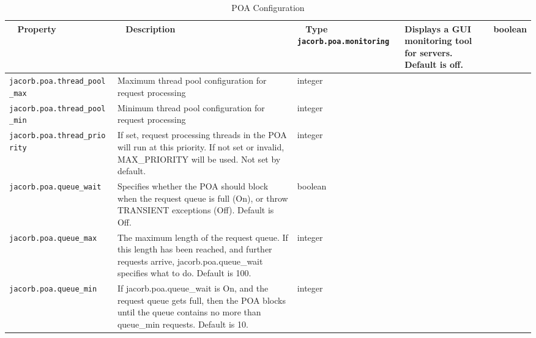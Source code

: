 \begin{small}
\begin{longtable}{|p{5cm}|p{9cm}|p{2cm}|}
\caption{POA Configuration}\\
\hline
~ \hfill \textbf {Property} \hfill ~ & ~ \hfill \textbf {Description} \hfill ~ & ~ \hfill \textbf {Type} \hfill ~ \endhead
\hline
\verb"jacorb.poa.monitoring" & Displays a GUI monitoring tool for servers. Default is off. & boolean \\
\hline
\verb"jacorb.poa.thread_pool"
\verb"_max" & Maximum thread pool configuration for request processing & integer \\
\hline
\verb"jacorb.poa.thread_pool"
\verb"_min" & Minimum thread pool configuration for request processing & integer \\
\hline
\verb"jacorb.poa.thread_prio"
\verb"rity" & If set, request processing threads in the POA will run at this priority. If not set or invalid, MAX\_PRIORITY will be used. Not set by default. & integer \\
\hline
\verb"jacorb.poa.queue_wait" & Specifies whether the POA should block
when the request queue is full (On), or throw TRANSIENT exceptions
(Off). Default is Off. & boolean\\
\hline
\verb"jacorb.poa.queue_max" & The maximum length of the request
queue.  If this length has been reached, and further requests arrive,
jacorb.poa.queue\_wait specifies what to do. Default is 100. & integer \\
\hline
\verb"jacorb.poa.queue_min" & If jacorb.poa.queue\_wait is On, and the
request queue gets full, then the POA blocks until the queue contains
no more than queue\_min requests. Default is 10. & integer \\
\hline

\end{longtable}
\end{small}


